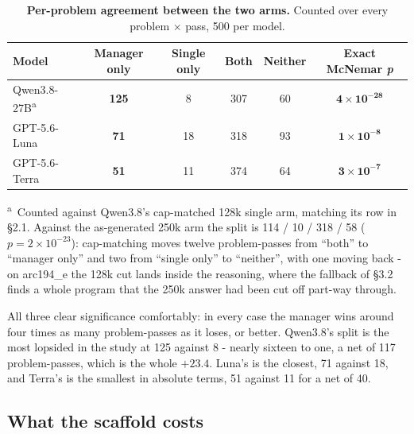 \documentclass[11pt]{article}
\begin{document}
\begin{table}[htbp]
\centering
\caption{\textbf{Per-problem agreement between the two arms.} Counted over every problem
$\times$ pass, 500 per model.}
\small
\begin{tabular}{@{}lccccc@{}}
\toprule
\textbf{Model} & \textbf{Manager only} & \textbf{Single only} & \textbf{Both} &
\textbf{Neither} & \textbf{Exact McNemar \textit{p}} \\
\midrule
Qwen3.8-27B\textsuperscript{a} & \textbf{125} & 8 & 307 & 60  & $\mathbf{4 \times 10^{-28}}$ \\
GPT-5.6-Luna  & \textbf{71} & 18 & 318 & 93  & $\mathbf{1 \times 10^{-8}}$ \\
GPT-5.6-Terra & \textbf{51} & 11 & 374 & 64  & $\mathbf{3 \times 10^{-7}}$ \\
\bottomrule
\end{tabular}

\vspace{0.6ex}
\begin{minipage}{0.85\linewidth}
\footnotesize
\textsuperscript{a}~Counted against Qwen3.8's cap-matched 128k single arm, matching its row
in \S2.1. Against the as-generated 250k arm the split is 114 / 10 / 318 / 58
($p = 2 \times 10^{-23}$): cap-matching moves twelve problem-passes from ``both'' to
``manager only'' and two from ``single only'' to ``neither'', with one moving back - on
arc194\_e the 128k cut lands inside the reasoning, where the fallback of \S3.2 finds a
whole program that the 250k answer had been cut off part-way through.
\end{minipage} 
\end{table}

All three clear significance comfortably: in every case the manager wins around four times
as many problem-passes as it loses, or better. Qwen3.8's split is the most lopsided in the study at
125 against 8 - nearly sixteen to one, a net of 117 problem-passes, which is the whole $+23.4$.
Luna's is the closest, 71 against 18, and Terra's is the smallest in absolute terms, 51
against 11 for a net of 40.

\FloatBarrier

\subsection{What the scaffold costs}
\end{document}
